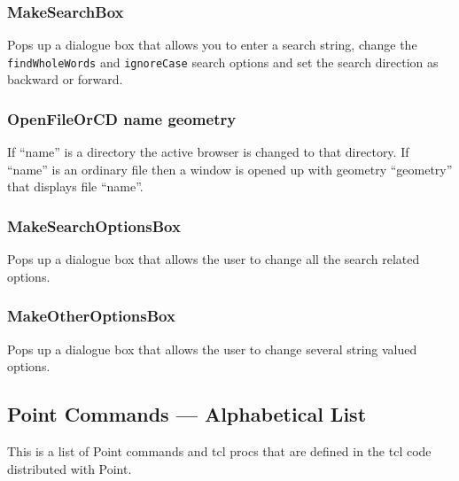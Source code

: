 \subsubsection{MakeSearchBox}
Pops up a dialogue box that allows you to enter a search
string, change the {\tt findWholeWords}
and {\tt ignoreCase} search options
and set the search direction as backward or forward.

\subsubsection{OpenFileOrCD name geometry}
If ``name'' is a directory the active browser
is changed to that directory.
If ``name'' is an ordinary file then a window is opened
up with geometry ``geometry'' that displays file ``name''.

\subsubsection{MakeSearchOptionsBox}
Pops up a dialogue box that allows the user to change
all the search related options.

\subsubsection{MakeOtherOptionsBox}
Pops up a dialogue box that allows the user to change
several string valued options.







\subsection{ Point Commands --- Alphabetical List }

This is a list of Point commands and tcl procs that are defined
in the tcl code distributed with Point.

